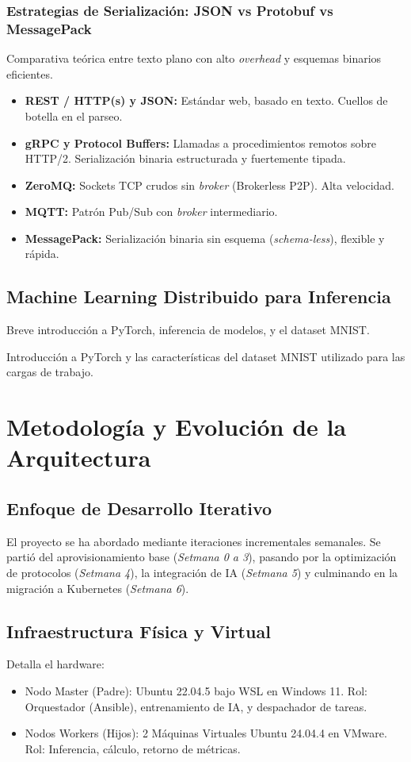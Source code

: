 \documentclass[11pt, a4paper]{report}
\begin{document}
\subsection{Estrategias de Serialización: JSON vs Protobuf vs MessagePack}
Comparativa teórica entre texto plano con alto \textit{overhead} y esquemas binarios eficientes.

\begin{itemize}
    \item \textbf{REST / HTTP(s) y JSON:} Estándar web, basado en texto. Cuellos de botella en el parseo.
    \item \textbf{gRPC y Protocol Buffers:} Llamadas a procedimientos remotos sobre HTTP/2. Serialización binaria estructurada y fuertemente tipada.
    \item \textbf{ZeroMQ:} Sockets TCP crudos sin \textit{broker} (Brokerless P2P). Alta velocidad.
    \item \textbf{MQTT:} Patrón Pub/Sub con \textit{broker} intermediario.
    \item \textbf{MessagePack:} Serialización binaria sin esquema (\textit{schema-less}), flexible y rápida.
\end{itemize}

\section{Machine Learning Distribuido para Inferencia}
Breve introducción a PyTorch, inferencia de modelos, y el dataset MNIST.

Introducción a PyTorch y las características del dataset MNIST utilizado para las cargas de trabajo.

\chapter{Metodología y Evolución de la Arquitectura}

\section{Enfoque de Desarrollo Iterativo}
El proyecto se ha abordado mediante iteraciones incrementales semanales. Se partió del aprovisionamiento base (\textit{Setmana 0 a 3}), pasando por la optimización de protocolos (\textit{Setmana 4}), la integración de IA (\textit{Setmana 5}) y culminando en la migración a Kubernetes (\textit{Setmana 6}).

\section{Infraestructura Física y Virtual}
Detalla el hardware:
\begin{itemize}
    \item Nodo Master (Padre): Ubuntu 22.04.5 bajo WSL en Windows 11. Rol: Orquestador (Ansible), entrenamiento de IA, y despachador de tareas.
    \item Nodos Workers (Hijos): 2 Máquinas Virtuales Ubuntu 24.04.4 en VMware. Rol: Inferencia, cálculo, retorno de métricas.
\end{itemize}
\end{document}
